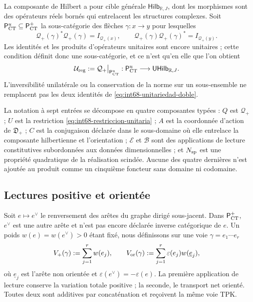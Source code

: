 La composante de Hilbert a pour cible générale
\(\mathsf{Hilb}_{\mathbb R,J}\), dont les morphismes sont des opérateurs réels
bornés qui entrelacent les structures complexes. Soit
\(\mathsf P_{\rm CT}^{u}\subseteq\mathsf P_{\rm CT}^{+}\) la sous-catégorie
des flèches \(\gamma:x\to y\) pour lesquelles
\begin{equation}
 \mathcal Q_+(\gamma)^*\mathcal Q_+(\gamma)=I_{\mathcal Q_+(x)},
 \qquad
 \mathcal Q_+(\gamma)\mathcal Q_+(\gamma)^*=I_{\mathcal Q_+(y)}.
 \label{eq:int68-unitariedad-doble}
\end{equation}
Les identités et les produits d'opérateurs unitaires sont encore
unitaires ; cette condition définit donc une sous-catégorie, et ce n'est qu'en elle que
l'on obtient
\begin{equation}
 \mathcal U_{\rm reg}:=
 \mathcal Q_+\big|_{\mathsf P_{\rm CT}^{u}}:
 \mathsf P_{\rm CT}^{u}\longrightarrow
 \mathsf{UHilb}_{\mathbb R,J}.
 \label{eq:int68-restriccion-unitaria}
\end{equation}
L'inversibilité unilatérale ou la conservation de la norme sur un sous-ensemble ne
remplacent pas les deux identités de \eqref{eq:int68-unitariedad-doble}.

La notation à sept entrées se décompose en quatre composantes
typées : \(Q\) est \(\mathcal Q_+\) ;
\(U\) est la restriction \eqref{eq:int68-restriccion-unitaria} ; \(A\) est la
coordonnée d'action de \(\mathfrak D_+\) ; \(C\) est la conjugaison déclarée
dans le sous-domaine où elle entrelace la composante hilbertienne et l'orientation ;
\(\mathcal E\) et \(\mathcal B\) sont des applications de lecture constitutives subordonnées aux
données dimensionnelles ; et \(N_{\rm sp}\) est une propriété quadratique de la
réalisation scindée. Aucune des quatre dernières n'est ajoutée au produit comme
un cinquième foncteur sans domaine ni codomaine.

\subsection{Lectures positive et orientée}

Soit \(e\mapsto e^\vee\) le renversement des arêtes du graphe dirigé
sous-jacent. Dans \(\mathsf P_{\rm CT}^{+}\), \(e^\vee\) est une autre arête et n'est
pas encore déclarée inverse catégorique de \(e\). Un poids
\(w(e)=w(e^\vee)>0\) étant fixé, nous définissons sur une voie
\(\gamma=e_1\cdots e_r\)
\[
 V_+(\gamma):=\sum_{j=1}^r w(e_j),
 \qquad
 V_{\rm or}(\gamma):=
 \sum_{j=1}^r\varepsilon(e_j)w(\underline e_j),
\]
où \(\underline e_j\) est l'arête non orientée et
\(\varepsilon(e^\vee)=-\varepsilon(e)\). La première application de lecture conserve
la variation totale positive ; la seconde, le transport net orienté. Toutes deux sont
additives par concaténation et reçoivent la même voie TPK.

